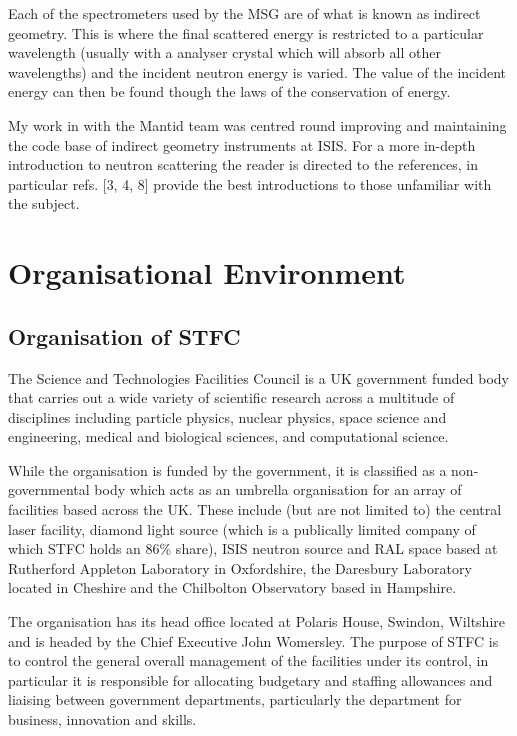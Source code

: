\documentclass[paper=a4, fontsize=11pt]{scrartcl}	%
\numberwithin{equation}{section}															%
\numberwithin{figure}{section}																%
\numberwithin{table}{section}
\begin{document}
Each of the spectrometers used by the MSG are of what is known as
indirect geometry. This is where the final scattered energy is
restricted to a particular wavelength (usually with a analyser crystal
which will absorb all other wavelengths) and the incident neutron energy
is varied. The value of the incident energy can then be found though the
laws of the conservation of energy.

My work in with the Mantid team was centred round improving and
maintaining the code base of indirect geometry instruments at ISIS. For
a more in-depth introduction to neutron scattering the reader is
directed to the references, in particular refs. {[}3, 4, 8{]} provide
the best introductions to those unfamiliar with the subject.

\section{Organisational Environment}\label{organisational-environment}

\subsection{Organisation of STFC}\label{organisation-of-stfc}

The Science and Technologies Facilities Council is a UK government
funded body that carries out a wide variety of scientific research
across a multitude of disciplines including particle physics, nuclear
physics, space science and engineering, medical and biological sciences,
and computational science.

While the organisation is funded by the government, it is classified as
a non-governmental body which acts as an umbrella organisation for an
array of facilities based across the UK. These include (but are not
limited to) the central laser facility, diamond light source (which is a
publically limited company of which STFC holds an 86\% share), ISIS
neutron source and RAL space based at Rutherford Appleton Laboratory in
Oxfordshire, the Daresbury Laboratory located in Cheshire and the
Chilbolton Observatory based in Hampshire.

The organisation has its head office located at Polaris House, Swindon,
Wiltshire and is headed by the Chief Executive John Womersley. The
purpose of STFC is to control the general overall management of the
facilities under its control, in particular it is responsible for
allocating budgetary and staffing allowances and liaising between
government departments, particularly the department for business,
innovation and skills.
\end{document}
